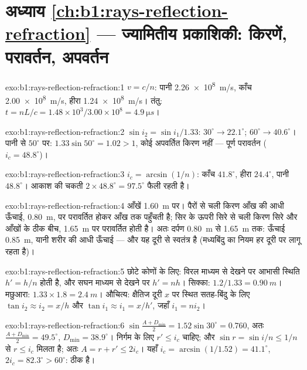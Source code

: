 \section*{अध्याय \ref{ch:b1:rays-reflection-refraction} --- ज्यामितीय प्रकाशिकी: किरणें, परावर्तन, अपवर्तन}

\begin{solution}{exo:b1:rays-reflection-refraction:1}
$v = c/n$: पानी \qty{2.26e8}{m/s}, काँच \qty{2.00e8}{m/s}, हीरा
\qty{1.24e8}{m/s}। तंतु: $t = nL/c = 1.48 \times 10^3/3.00\times10^8 =
\qty{4.9}{\micro s}$।
\end{solution}

\begin{solution}{exo:b1:rays-reflection-refraction:2}
$\sin i_2 = \sin i_1/1.33$: $30^\circ \to 22.1^\circ$; $60^\circ \to
40.6^\circ$। पानी से $50^\circ$ पर: $1.33\sin 50^\circ = 1.02 > 1$,
कोई अपवर्तित किरण नहीं --- पूर्ण परावर्तन ($i_c = 48.8^\circ$)।
\end{solution}

\begin{solution}{exo:b1:rays-reflection-refraction:3}
$i_c = \arcsin(1/n)$: काँच $41.8^\circ$, हीरा $24.4^\circ$, पानी
$48.8^\circ$। आकाश की चकती $2 \times 48.8^\circ = 97.5^\circ$ फैली रहती है।
\end{solution}

\begin{solution}{exo:b1:rays-reflection-refraction:4}
आँखें \qty{1.60}{m} पर। पैरों से चली किरण आँख की आधी ऊँचाई,
\qty{0.80}{m}, पर परावर्तित होकर आँख तक पहुँचती है; सिर के ऊपरी सिरे से चली
किरण सिरे और आँखों के ठीक बीच, \qty{1.65}{m} पर परावर्तित होती है। अतः दर्पण
\qty{0.80}{m} से \qty{1.65}{m} तक: ऊँचाई \qty{0.85}{m}, यानी शरीर की आधी
ऊँचाई --- और यह दूरी से स्वतंत्र है (मध्यबिंदु का नियम हर दूरी पर लागू रहता
है)।
\end{solution}

\begin{solution}{exo:b1:rays-reflection-refraction:5}
छोटे कोणों के लिए: विरल माध्यम से देखने पर आभासी स्थिति $h' = h/n$ होती है,
और सघन माध्यम से देखने पर $h' = nh$। सिक्का: $1.2/1.33 =
\qty{0.90}{m}$। मछुआरा: $1.33 \times 1.8 = \qty{2.4}{m}$। औचित्य:
क्षैतिज दूरी $x$ पर स्थित सतह-बिंदु के लिए $\tan i_2 \approx i_2 =
x/h$ और $\tan i_1 \approx i_1 = x/h'$, जहाँ $i_1 = n i_2$।
\end{solution}

\begin{solution}{exo:b1:rays-reflection-refraction:6}
$\sin\frac{A + D_{\min}}{2} = 1.52\sin 30^\circ = 0.760$, अतः
$\frac{A + D_{\min}}{2} = 49.5^\circ$, $D_{\min} = 38.9^\circ$।
निर्गम के लिए $r' \leq i_c$ चाहिए; और $\sin r = \sin i/n \leq 1/n$ से
$r \leq i_c$ मिलता है; अतः $A = r + r' \leq 2i_c$। यहाँ $i_c = \arcsin(1/1.52) =
41.1^\circ$, $2i_c = 82.3^\circ > 60^\circ$: ठीक है।
\end{solution}

